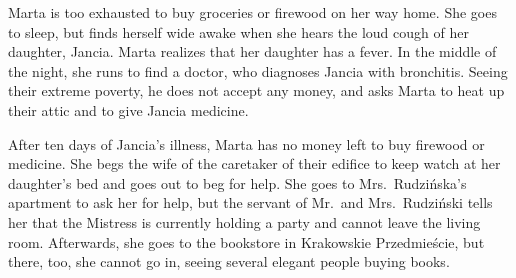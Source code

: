 Marta is too exhausted to buy groceries or firewood on her way home.
She goes to sleep, but finds herself wide awake when she hears the loud cough of her daughter, Jancia.
Marta realizes that her daughter has a fever.
In the middle of the night, she runs to find a doctor, who diagnoses Jancia with bronchitis.
Seeing their extreme poverty, he does not accept any money, and asks Marta to heat up their attic and to give Jancia medicine.

After ten days of Jancia's illness, Marta has no money left to buy firewood or medicine.
She begs the wife of the caretaker of their edifice to keep watch at her daughter's bed and goes out to beg for help.
She goes to Mrs.\ Rudzińska's apartment to ask her for help, but the servant of Mr.\ and Mrs.\ Rudziński tells her that the Mistress is currently holding a party and cannot leave the living room.
Afterwards, she goes to the bookstore in Krakowskie Przedmieście, but there, too, she cannot go in, seeing several elegant people buying books.
